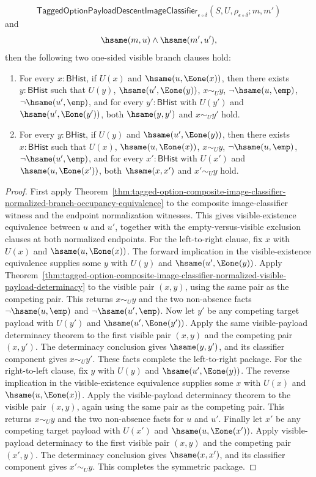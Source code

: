 \begin{theorem}
$$
\mathsf{TaggedOptionPayloadDescentImageClassifier}_{\epsilon\circ\delta}
(S,U,\rho_{\epsilon\circ\delta};m,m')
$$
and
$$
\hsame(m,u)\land \hsame(m',u'),
$$
then the following two one-sided visible branch clauses hold:
\begin{enumerate}
\item For every $x:\mathsf{BHist}$, if $U(x)$ and
$\hsame(u,\Eone(x))$, then there exists $y:\mathsf{BHist}$ such that $U(y)$,
$\hsame(u',\Eone(y))$, $x\sim_U y$, $\neg\hsame(u,\emp)$,
$\neg\hsame(u',\emp)$, and for every $y':\mathsf{BHist}$ with $U(y')$ and
$\hsame(u',\Eone(y'))$, both $\hsame(y,y')$ and $x\sim_U y'$ hold.
\item For every $y:\mathsf{BHist}$, if $U(y)$ and
$\hsame(u',\Eone(y))$, then there exists $x:\mathsf{BHist}$ such that $U(x)$,
$\hsame(u,\Eone(x))$, $x\sim_U y$, $\neg\hsame(u,\emp)$,
$\neg\hsame(u',\emp)$, and for every $x':\mathsf{BHist}$ with $U(x')$ and
$\hsame(u,\Eone(x'))$, both $\hsame(x,x')$ and $x'\sim_U y$ hold.
\end{enumerate}
\end{theorem}
\begin{proof}
First apply
Theorem~\ref{thm:tagged-option-composite-image-classifier-normalized-branch-occupancy-equivalence}
to the composite image-classifier witness and the endpoint normalization
witnesses. This gives visible-existence equivalence between $u$ and $u'$,
together with the empty-versus-visible exclusion clauses at both normalized
endpoints.
For the left-to-right clause, fix $x$ with $U(x)$ and
$\hsame(u,\Eone(x))$. The forward implication in the visible-existence
equivalence supplies some $y$ with $U(y)$ and $\hsame(u',\Eone(y))$.
Apply
Theorem~\ref{thm:tagged-option-composite-image-classifier-normalized-visible-payload-determinacy}
to the visible pair $(x,y)$, using the same pair as the competing pair. This
returns $x\sim_U y$ and the two non-absence facts
$\neg\hsame(u,\emp)$ and $\neg\hsame(u',\emp)$.
Now let $y'$ be any competing target payload with $U(y')$ and
$\hsame(u',\Eone(y'))$. Apply the same visible-payload determinacy theorem to
the first visible pair $(x,y)$ and the competing pair $(x,y')$. The determinacy
conclusion gives $\hsame(y,y')$, and its classifier component gives
$x\sim_U y'$. These facts complete the left-to-right package.
For the right-to-left clause, fix $y$ with $U(y)$ and
$\hsame(u',\Eone(y))$. The reverse implication in the visible-existence
equivalence supplies some $x$ with $U(x)$ and $\hsame(u,\Eone(x))$.
Apply the visible-payload determinacy theorem to the visible pair $(x,y)$,
again using the same pair as the competing pair. This returns $x\sim_U y$ and
the two non-absence facts for $u$ and $u'$.
Finally let $x'$ be any competing target payload with $U(x')$ and
$\hsame(u,\Eone(x'))$. Apply visible-payload determinacy to the first visible
pair $(x,y)$ and the competing pair $(x',y)$. The determinacy conclusion gives
$\hsame(x,x')$, and its classifier component gives $x'\sim_U y$. This completes
the symmetric package.
\end{proof}

